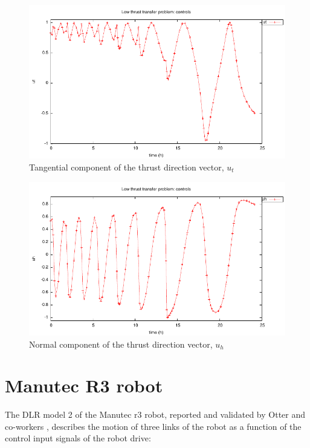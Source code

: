\documentclass[a4paper,11pt]{report}    %
\begin{document}
\begin{figure}
  \centering 
  \includegraphics{../examples/lowthr/lowthr_u2}
  \caption{Tangential component of the thrust direction vector, $u_t$}
 \label{fig:lowthr_u2}
\end{figure}

\begin{figure}
  \centering 
  \includegraphics{../examples/lowthr/lowthr_u3}
  \caption{Normal component of the thrust direction vector, $u_h$}
 \label{fig:lowthr_u3}
\end{figure}

\section{Manutec R3 robot}

The DLR model 2  of the Manutec r3 robot, reported and validated by Otter and co-workers \cite{Otter:88, Franke:93}, describes the motion of three
links of the robot as a function of the control input signals of the robot drive:
\end{document}
